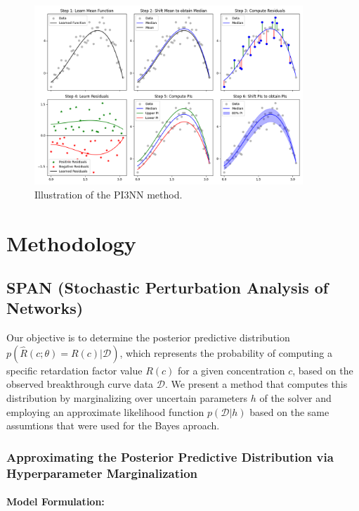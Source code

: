 \begin{figure}
    \centering
    \includegraphics[width=0.9\textwidth]{figs/3pinn_illustration.png}
    \caption{Illustration of the PI3NN method.}
    \label{fig:3pinn_illustration}
\end{figure}





\section{Methodology}
\subsection{SPAN (Stochastic Perturbation Analysis of Networks)}
Our objective is to determine the posterior predictive distribution $p(\hat{R}(c; \theta) = R(c)| \mathcal{D})$, which represents the probability of computing a specific retardation factor value $R(c)$ for a given concentration $c$, based on the observed breakthrough curve data $\mathcal{D}$. We present a method that computes this distribution by marginalizing over uncertain parameters $h$ of the solver and employing an approximate likelihood function $p(\mathcal{D} | h)$ based on the same assumtions that were used for the Bayes aproach.

\subsubsection{Approximating the Posterior Predictive Distribution via Hyperparameter Marginalization}

\paragraph{Model Formulation:}

